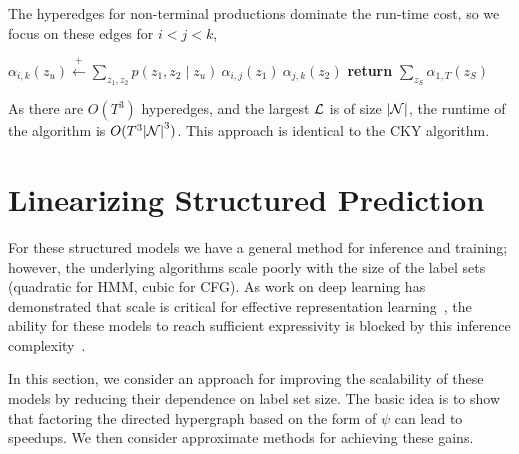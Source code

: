 \documentclass{article}
\begin{document}
The hyperedges for non-terminal productions dominate 
the run-time cost, so we focus on these edges for $i < j < k$,
\begin{algorithm}
\begin{algorithmic} 
\ENDFOR
{}
\STATE $\alpha_{i,k}(z_{u}) \stackrel{+}{\gets} \displaystyle \sum_{z_1, z_2}  p(z_1, z_2 \mid z_{u}) \  \alpha_{i, j}(z_1)\ \alpha_{j,k}(z_2)$
\ENDFOR
\ENDFOR
\STATE \textbf{return} $\sum_{z_S} \alpha_{1,T}(z_S)$
\end{algorithmic} 
\end{algorithm}



As there are $O(T^3)$ hyperedges, and the largest ${\cal L}$ is of size
$|\mathcal{N}|$, the runtime of the algorithm is $O(T^3 {|\cal N|}^3)$. This approach is identical to the CKY algorithm.


\section{Linearizing Structured Prediction}

For these structured models we have a general method for inference and training; however, the underlying algorithms scale poorly with the size of the label sets (quadratic for HMM, cubic for CFG).
As work on deep learning has demonstrated that scale is critical for effective representation learning~\citep{gpt3}, the ability for these models to
reach sufficient expressivity is blocked by this inference complexity~\citep{chiu2020scaling}.

In this section, we consider an approach for improving the scalability
of these models by reducing their dependence on label set size. The basic idea is to show that factoring the directed hypergraph
based on the form of $\psi$ can lead to speedups. We then
consider approximate methods for achieving these gains.

\end{document}
